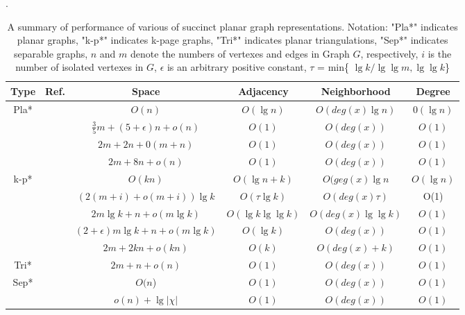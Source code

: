 \documentclass[12pt,glossary]{dalthesis}
\begin{document}
\begin{table}[]
\small
\centering
\caption{A summary of performance of various of succinct planar graph representations. Notation: "Pla*" indicates planar graphs, "k-p*" indicates k-page graphs, "Tri*" indicates planar triangulations, "Sep*" indicates separable graphs, $n$ and $m$ denote the numbers of vertexes and edges in Graph $G$, respectively, $i$ is the number of isolated vertexes in $G$, $\epsilon$ is an arbitrary positive constant, $\tau$ = min\{ $\lg k / \lg \lg m, \lg \lg k$\} }. 
\label{my-label}
\begin{tabular}{|c|c|c|c|c|c|}
\hline
Type                       & Ref. & Space & Adjacency & Neighborhood & Degree \\ \hline
\multirow{4}{*}{Pla*}    &  ~\cite{Jacobson}    & $O(n)$ &   $O(\lg n)$   &       $O(deg(x) \lg n)$       &    $0(\lg n)$    \\ \cline{2-6} 
                           &   ~\cite{Chuang} &  $\frac{3}{5} m + (5+ \epsilon )n + o(n) $  & $O(1)$  & $O(deg(x))$ &   $O(1)$     \\ \cline{2-6} 
                           & ~\cite{Chiang} & $2m+2n+0(m+n)$& $O(1)$  &  $O(deg(x))$  &  $O(1)$     \\ \cline{2-6} 
                           & ~\cite{Munro} & $2m+8n+o(n)$&  $O(1)$  &  $O(deg(x))$  &   $O(1)$  \\ \hline
\multirow{5}{*}{k-p*}    &  ~\cite{Jacobson} &  $O(kn)$  & $O(\lg n + k)$  &  $O(geg(x)\lg n$  &  $O(\lg n)$ \\ \cline{2-6} 
                           &   ~\cite{Gavoille}   & $(2(m+i)+o(m+i))\lg k$ & $O(\tau \lg k)$  &  $O(deg(x) \tau)$ & O(1) \\ \cline{2-6} 
                           &  ~\cite{Barbay} & $2m \lg k+n+o(m \lg k)$  & $O(\lg k \lg \lg k)$  & $O(deg(x) \lg \lg k)$ &   $O(1)$  \\ \cline{2-6} 
                           &   ~\cite{Barbay}   & $(2+\epsilon )m\lg k+n+o(m\lg k)$ & $O(\lg k)$ & $O(deg(x))$& $O(1)$        \\ \cline{2-6} 
                           &~\cite{Munro} & $2m+2kn+o(kn)$ & $O(k)$  & $O(deg(x)+k)$ &  $O(1)$  \\ \hline
\multirow{1}{*}{Tri*} &  ~\cite{Chuang}    & $2m+n+o(n)$  & $O(1)$      & $O(deg(x))$    & $O(1)$   \\ \hline
                           
\multirow{2}{*}{Sep*} &  ~\cite{compact-representation}    & $O(n$)  & $O(1)$      & $O(deg(x))$    & $O(1)$   \\ \cline{2-6} 
                           &  ~\cite{succinct-representation}    &  $o(n)+ \lg |\chi|$     & $O(1)$      & $O(deg(x))$    & $O(1)$   \\ \hline
\end{tabular}
\end{table}    
\end{document}

